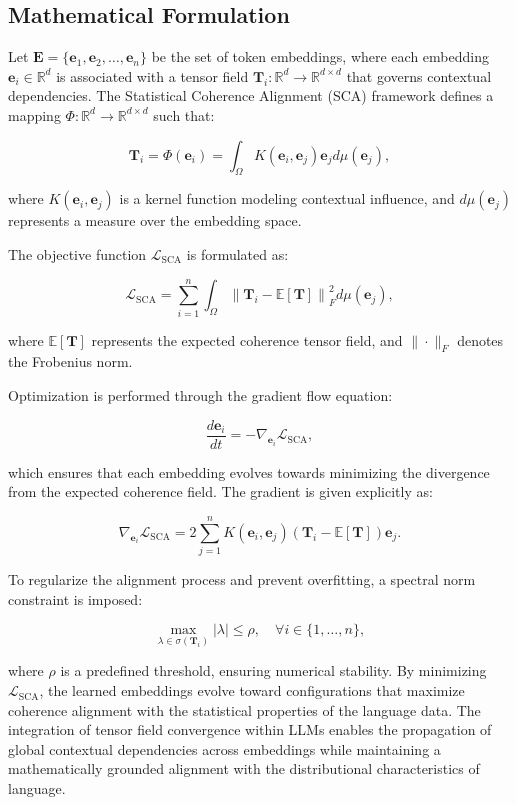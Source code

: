 \documentclass{article}
\begin{document}
\subsection{Mathematical Formulation}

Let \( \mathbf{E} = \{ \mathbf{e}_1, \mathbf{e}_2, \dots, \mathbf{e}_n \} \) be the set of token embeddings, where each embedding \( \mathbf{e}_i \in \mathbb{R}^d \) is associated with a tensor field \( \mathbf{T}_i: \mathbb{R}^d \to \mathbb{R}^{d \times d} \) that governs contextual dependencies. The Statistical Coherence Alignment (SCA) framework defines a mapping \( \Phi: \mathbb{R}^d \to \mathbb{R}^{d \times d} \) such that:

\[
\mathbf{T}_i = \Phi(\mathbf{e}_i) = \int_{\Omega} K(\mathbf{e}_i, \mathbf{e}_j) \mathbf{e}_j d\mu(\mathbf{e}_j),
\]

where \( K(\mathbf{e}_i, \mathbf{e}_j) \) is a kernel function modeling contextual influence, and \( d\mu(\mathbf{e}_j) \) represents a measure over the embedding space.

The objective function \( \mathcal{L}_{\text{SCA}} \) is formulated as:

\[
\mathcal{L}_{\text{SCA}} = \sum_{i=1}^{n} \int_{\Omega} \left\| \mathbf{T}_i - \mathbb{E}[\mathbf{T}] \right\|_F^2 d\mu(\mathbf{e}_j),
\]

where \( \mathbb{E}[\mathbf{T}] \) represents the expected coherence tensor field, and \( \|\cdot\|_F \) denotes the Frobenius norm.

Optimization is performed through the gradient flow equation:

\[
\frac{d\mathbf{e}_i}{dt} = -\nabla_{\mathbf{e}_i} \mathcal{L}_{\text{SCA}},
\]

which ensures that each embedding evolves towards minimizing the divergence from the expected coherence field. The gradient is given explicitly as:

\[
\nabla_{\mathbf{e}_i} \mathcal{L}_{\text{SCA}} = 2 \sum_{j=1}^{n} K(\mathbf{e}_i, \mathbf{e}_j) (\mathbf{T}_i - \mathbb{E}[\mathbf{T}]) \mathbf{e}_j.
\]

To regularize the alignment process and prevent overfitting, a spectral norm constraint is imposed:

\[
\max_{\lambda \in \sigma(\mathbf{T}_i)} |\lambda| \leq \rho, \quad \forall i \in \{1, \dots, n\},
\]

where \( \rho \) is a predefined threshold, ensuring numerical stability. By minimizing \( \mathcal{L}_{\text{SCA}} \), the learned embeddings evolve toward configurations that maximize coherence alignment with the statistical properties of the language data. The integration of tensor field convergence within LLMs enables the propagation of global contextual dependencies across embeddings while maintaining a mathematically grounded alignment with the distributional characteristics of language.
\end{document}
